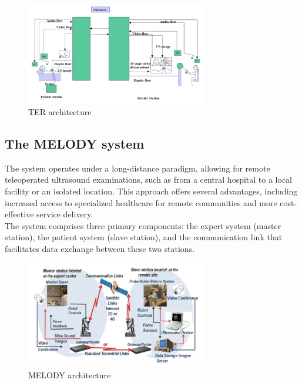 \documentclass{article}
\begin{document}
\begin{figure}[h]
    \centering
    \includegraphics[width=0.7\textwidth]{TER.png}  
    \caption{TER architecture}
    \label{fig:ter}
\end{figure}


\subsection{The MELODY system}
The system operates under a long-distance paradigm, allowing for remote teleoperated ultrasound examinations, such as from a central hospital to a local facility or an isolated location. This approach offers several advantages, including increased access to specialized healthcare for remote communities and more cost-effective service delivery.
\\The system comprises three primary components: the expert system (master station), the patient system (slave station), and the communication link that facilitates data exchange between these two stations.

\begin{figure}[h]
    \centering
    \includegraphics[width=0.7\textwidth]{MELODY.png}  
    \caption{MELODY architecture}
    \label{fig:melody}
\end{figure}
\end{document}
